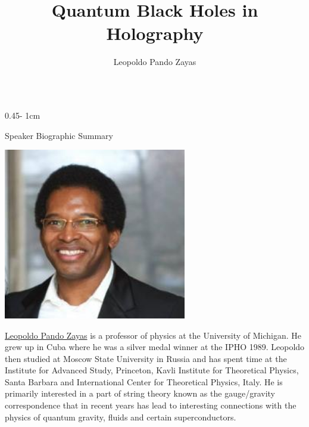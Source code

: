 \documentclass{../psuposter}
\title{Quantum Black Holes in Holography}
\author{Leopoldo Pando Zayas \inst{1}}
\institute{\inst{1} University of Michigan}
\begin{document}
\begin{frame}
\begin{columns}[t, totalwidth=\textwidth]
\begin{column}{0.45\textwidth - 1cm}


    \begin{block}{Speaker Biographic Summary}
    	\begin{center}
    		\includegraphics[width=0.6\textwidth]{images/leopoldo-pando-zayas}
    	\end{center}
    	\href{https://www.tpi.uni-jena.de/~bernuzzi/about.html}{Leopoldo Pando Zayas} is a professor of physics at the University of Michigan. He grew up in Cuba where he was a silver medal winner at the IPHO 1989. Leopoldo then studied at Moscow State University in Russia and has spent time at the Institute for Advanced Study, Princeton, Kavli Institute for Theoretical Physics, Santa Barbara and International Center for Theoretical Physics, Italy. He is primarily interested in a part of string theory known as the gauge/gravity correspondence that in recent years has lead to interesting connections with the physics of quantum gravity, fluids and certain superconductors. \cite{LeopoldoPandoZayas}
    \end{block}



\end{column}
\end{columns}
\end{frame}
\end{document}
